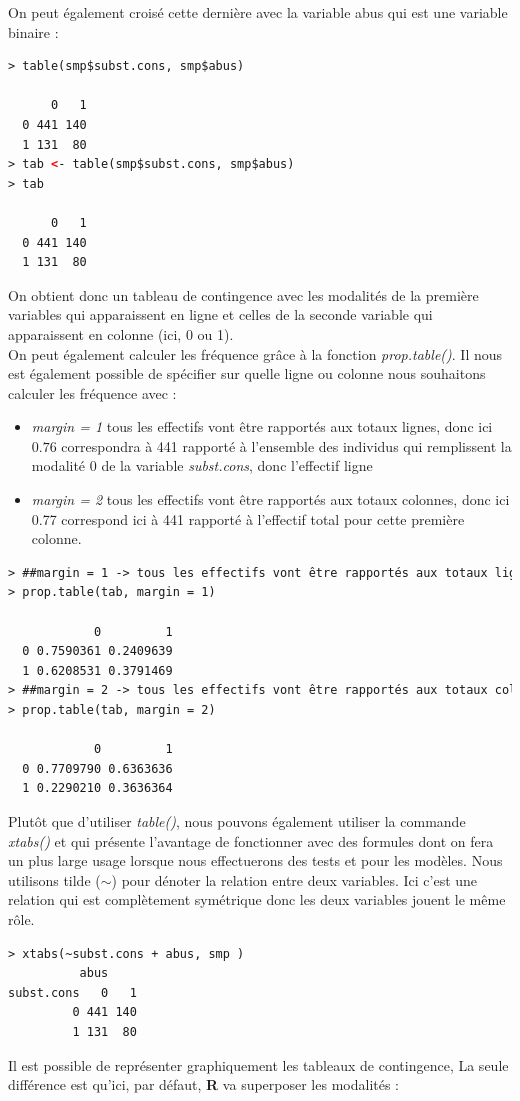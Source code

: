 On peut également croisé cette dernière avec la variable abus qui est une variable binaire :
\begin{lstlisting}[language=html]
> table(smp$subst.cons, smp$abus)
   
      0   1
  0 441 140
  1 131  80
> tab <- table(smp$subst.cons, smp$abus)
> tab
   
      0   1
  0 441 140
  1 131  80
\end{lstlisting}

On obtient donc un tableau de contingence avec les modalités de la première variables qui apparaissent en ligne et celles de la seconde variable qui apparaissent en colonne (ici, 0 ou 1).\newline
\\ 
On peut également calculer les fréquence grâce à la fonction \textit{prop.table()}. Il nous est également possible de spécifier sur quelle ligne ou colonne nous souhaitons calculer les fréquence avec :
\begin{itemize}
\item \textit{margin = 1} tous les effectifs vont être rapportés aux totaux lignes, donc ici $0.76$ correspondra à 441 rapporté à l'ensemble des individus qui remplissent la modalité $0$ de la variable \textit{subst.cons}, donc l'effectif ligne
\item \textit{margin = 2} tous les effectifs vont être rapportés aux totaux colonnes, donc ici 0.77 correspond ici à 441 rapporté à l'effectif total pour cette première colonne. 
\end{itemize}
\begin{lstlisting}[language=html]
> ##margin = 1 -> tous les effectifs vont être rapportés aux totaux lignes
> prop.table(tab, margin = 1)
   
            0         1
  0 0.7590361 0.2409639
  1 0.6208531 0.3791469
> ##margin = 2 -> tous les effectifs vont être rapportés aux totaux colonnes
> prop.table(tab, margin = 2)
   
            0         1
  0 0.7709790 0.6363636
  1 0.2290210 0.3636364
\end{lstlisting}
Plutôt que d'utiliser \textit{table()}, nous pouvons également utiliser la commande \textit{xtabs()} et qui présente l'avantage de fonctionner avec des formules dont on fera un plus large usage lorsque nous effectuerons des tests et pour les modèles.\newline
Nous utilisons tilde ($\sim$) pour dénoter la relation entre deux variables. Ici c'est une relation qui est complètement symétrique donc les deux variables jouent le même rôle.
\begin{lstlisting}[language=html]
> xtabs(~subst.cons + abus, smp )
          abus
subst.cons   0   1
         0 441 140
         1 131  80
\end{lstlisting}
Il est possible de représenter graphiquement les tableaux de contingence, La seule différence est qu'ici, par défaut, \textbf{R} va superposer les modalités : 

